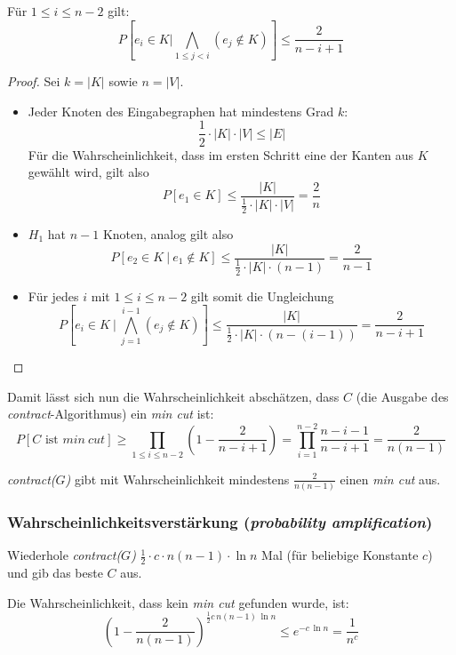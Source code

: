 \begin{lemm}
	Für $1 \leq i \leq n-2$ gilt:
	\[ P\left[e_i \in K | \bigwedge_{1\leq j < i} \left(e_j \not\in K\right) \right] \leq \frac{2}{n-i+1} \]
\end{lemm}
\begin{proof} Sei $k = |K|$ sowie $n = |V|$.
	\begin{itemize}
		\item Jeder Knoten des Eingabegraphen hat mindestens Grad $k$:
			\[ \frac{1}{2} \cdot |K| \cdot |V| \leq |E| \]
			Für die Wahrscheinlichkeit, dass im ersten Schritt eine
			der Kanten aus $K$ gewählt wird, gilt also
			\[ P\left[e_1 \in K\right] \leq
			\frac{|K|}{\frac{1}{2}\cdot |K| \cdot |V|} =
			\frac{2}{n} \]
		\item $H_1$ hat $n-1$ Knoten, analog gilt also
			\[ P\left[e_2 \in K\ |\ e_1 \not\in K\right] \leq
			\frac{|K|}{\frac{1}{2}\cdot |K| \cdot (n-1)} =
			\frac{2}{n-1} \]
		\item Für jedes $i$ mit $1 \leq i \leq n-2$ gilt somit die Ungleichung
			\[ P\left[e_i \in K\ \Big|\ \bigwedge_{j=1}^{i-1}
			\left(e_j \not\in K\right)\right] \leq
			\frac{|K|}{\frac{1}{2}\cdot |K| \cdot
			\left(n-(i-1)\right)} = \frac{2}{n-i+1} \]
	\end{itemize}
\end{proof}

Damit lässt sich nun die Wahrscheinlichkeit abschätzen, dass $C$ (die Ausgabe
des \emph{contract}-Algorithmus) ein \emph{min cut} ist:
\[
  P\left[ C \text{ ist } min\ cut\right] \geq \prod_{1\leq i \leq n-2}
  \left(1-\frac{2}{n-i+1}\right) = \prod_{i=1}^{n-2} \frac{n-i-1}{n-i+1} = \frac{2}{n(n-1)}
\]

\begin{satz}
	\emph{contract($G$)} gibt mit Wahrscheinlichkeit mindestens $\frac{2}{n(n-1)}$ einen \emph{min cut} aus.
\end{satz}

\subsubsection{Wahrscheinlichkeitsverstärkung (\emph{probability amplification})}
Wiederhole \emph{contract($G$)} $\frac{1}{2} \cdot c \cdot n(n-1)\cdot \ln n$
Mal (für beliebige Konstante $c$) und gib das beste $C$ aus.

Die Wahrscheinlichkeit, dass kein \emph{min cut} gefunden wurde, ist:
\[
  \left(1-\frac{2}{n(n-1)}\right)^{\frac{1}{2}c\,n(n-1)\,\ln n} \leq e^{-c\,\ln n} = \frac{1}{n^c}
\]

